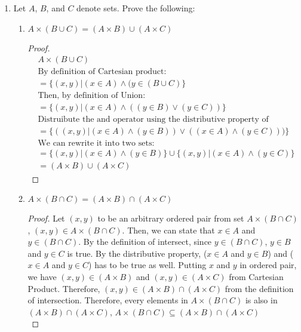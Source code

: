 \documentclass[12pt]{article}
\begin{document}
\begin{enumerate}
\begin{enumerate}[label=(\alph*)]
	\end{enumerate}
	\clearpage
	\item
	Let $A$, $B$, and $C$ denote sets. Prove the following:\\
	\begin{enumerate}
		\item $A\times (B \cup C) = (A\times B)\cup (A \times C)$\\
		\begin{proof}
		\begin{align*}
			&A\times (B \cup C)\\
			&\text{By definition of Cartesian product:}\\
			&=\{(x,y)| (x \in A) \wedge  (y \in (B\cup C)\}\\
			&\text{Then, by definition of Union:}\\   
			&=\{(x,y)| (x \in A) \wedge  ((y \in B) \vee (y \in C)) \}\\
			&\text{Distruibute the and operator using the distributive property of boolean algebra:}\\
			&=\{( (x,y)| (x \in A) \wedge (y \in B)) \vee( (x \in A) \wedge(y \in C)))\}\\
			&\text{We can rewrite it into two sets:}\\
			&=\{(x,y)|(x \in A) \wedge (y \in B)\}	\cup 	\{(x,y)| (x \in A) \wedge(y \in C)\}\\
			&=(A \times B) \cup (A \times C)
		\end{align*}
			\end{proof}
		\item $A\times (B\cap C) = (A\times B) \cap (A \times C)$\\
		\begin{proof}
Let $(x,y)$ to be an arbitrary ordered pair from set $A\times (B\cap C)$, $(x,y) \in A\times (B\cap C) $. Then, we can state that $x \in A$ and $y \in (B\cap C)$. By the definition of intersect, since $y \in (B\cap C)$,  $y \in B$ and $y \in C$ is true. By the distributive property, ($x \in A$ and $y \in B$) and ($x \in A$ and $y \in C$) has to be true as well. Putting $x$ and $y$ in ordered pair, we have $(x,y) \in (A \times B)$ and $(x,y) \in (A \times C)$ from Cartesian Product. Therefore, $(x,y) \in (A\times B) \cap (A \times C)$ from the definition of intersection. Therefore, every elements in $A\times (B\cap C)$ is also in $(A\times B) \cap (A \times C)$, $A\times (B\cap C) \subseteq (A\times B) \cap (A \times C)$ \\
	

\end{proof}
\end{enumerate}
\end{enumerate}
\end{document}
